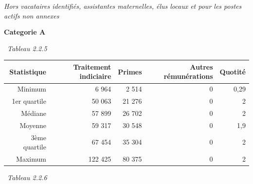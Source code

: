 \emph{Hors vacataires identifiés, assistantes maternelles, élus locaux
et pour les postes actifs non annexes}

\textbf{Categorie A}

~\emph{Tableau 2.2.5}

\begin{longtable}[]{@{}rrrrr@{}}
\toprule
Statistique & Traitement indiciaire & Primes & Autres rémunérations &
Quotité\tabularnewline
\midrule
\endhead
Minimum & 6 964 & 2 514 & 0 & 0,29\tabularnewline
1er quartile & 50 063 & 21 276 & 0 & 2\tabularnewline
Médiane & 57 899 & 26 702 & 0 & 2\tabularnewline
Moyenne & 59 317 & 30 548 & 0 & 1,9\tabularnewline
3ème quartile & 67 454 & 35 304 & 0 & 2\tabularnewline
Maximum & 122 425 & 80 375 & 0 & 2\tabularnewline
\bottomrule
\end{longtable}

~\emph{Tableau 2.2.6}


